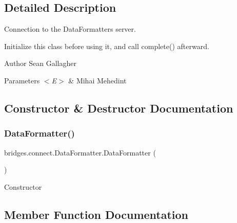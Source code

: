 \subsection{Detailed Description}
Connection to the Data\+Formatters server.

Initialize this class before using it, and call complete() afterward.

\begin{DoxyAuthor}{Author}
Sean Gallagher 
\end{DoxyAuthor}

\begin{DoxyParams}{Parameters}
{\em $<$\+E$>$} & Mihai Mehedint \\
\hline
\end{DoxyParams}


\subsection{Constructor \& Destructor Documentation}
\mbox{\label{classbridges_1_1connect_1_1_data_formatter_a31efd2251e98942e58e743dff213ef27}} 
\subsubsection{\texorpdfstring{Data\+Formatter()}{DataFormatter()}}
{\footnotesize\ttfamily bridges.\+connect.\+Data\+Formatter.\+Data\+Formatter (\begin{DoxyParamCaption}{ }\end{DoxyParamCaption})\hspace{0.3cm}{\ttfamily [protected]}}

Constructor 

\subsection{Member Function Documentation}
\mbox{\label{classbridges_1_1connect_1_1_data_formatter_ad87ca06456fa4dc110e167e84f2d4447}} 
